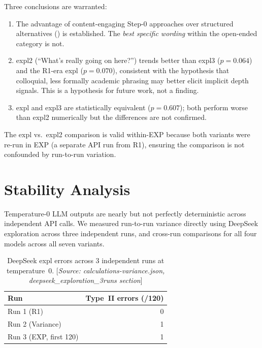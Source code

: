 \documentclass[11pt,a4paper]{article}
\begin{document}
\noindent Three conclusions are warranted:
\begin{enumerate}[noitemsep]
  \item The advantage of content-engaging Step-0 approaches over
    structured alternatives () is established.  The
    \emph{best specific wording} within the open-ended category is not.
  \item \textsf{expl2} (``What's really going on here?'') trends better
    than \textsf{expl3} ($p = 0.064$) and the R1-era \textsf{expl}
    ($p = 0.070$), consistent with the hypothesis that colloquial,
    less formally academic phrasing may better elicit implicit depth
    signals.  This is a hypothesis for future work, not a finding.
  \item \textsf{expl} and \textsf{expl3} are statistically equivalent
    ($p = 0.607$); both perform worse than \textsf{expl2} numerically
    but the differences are not confirmed.
\end{enumerate}

The \textsf{expl} vs.\ \textsf{expl2} comparison is valid within-EXP because
both variants were re-run in EXP (a separate API run from R1), ensuring the
comparison is not confounded by run-to-run variation.

\section{Stability Analysis}
\label{sec:stability}

Temperature-0 LLM outputs are nearly but not perfectly deterministic across
independent API calls.  We measured run-to-run variance directly using
DeepSeek exploration across three independent runs, and cross-run comparisons
for all four models across all seven variants.

\begin{table}[htbp]
\centering
\caption{DeepSeek \textsf{expl} errors across 3 independent runs
  at temperature~0.
  [\emph{Source: calculations-variance.json,
  deepseek\_exploration\_3runs section}]}
\label{tab:deepseek_runs}
\smallskip
\begin{tabular}{@{}lr@{}}
\toprule
Run & Type~II errors (/120) \\
\midrule
Run 1 (R1) & 0 \\
Run 2 (Variance) & 1 \\
Run 3 (EXP, first 120) & 1 \\
\bottomrule
\end{tabular}
\end{table}
\end{document}
